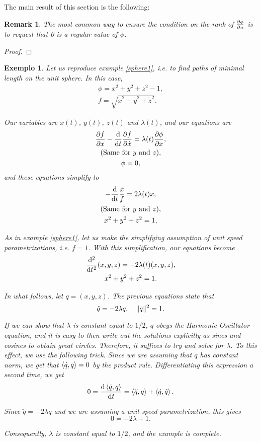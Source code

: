 \documentclass{article}
\theoremstyle{plain}
\theoremstyle{plain}
\newtheorem{remark}{Remark}
\newtheorem{example}{Exemplo}
\theoremstyle{nonumberplain}
\newtheorem{proof}{Dem}
\theoremstyle{empty}
\DeclarePairedDelimiter\norm{\lVert}{\rVert}
\begin{document}
The main result of this section is the following:


\begin{remark}
The most common way to ensure the condition on the rank of $\diffp \phi u$ is to request that 0 is a regular value of $\phi$.
\end{remark}

\begin{proof}
\end{proof}

\begin{example}
Let us reproduce example \ref{sphere1}, i.e. to find paths of minimal length on the unit sphere.  In this case,
\begin{gather*}
\phi = x^2 + y^2 + z^2 - 1,\\
f = \sqrt{\dot x^2 + \dot y^2 + \dot z^2}.
\end{gather*}

Our variables are $x(t)$, $y(t)$, $z(t)$ and $\lambda(t)$, and our equations are
\begin{gather*}
\diffp f x - \diff*{\diffp f {\dot x}}t = \lambda(t) \diffp \phi x,\\
\text{(Same for $y$ and $z$)},\\
\phi = 0,
\end{gather*}
and these equations simplify to
\begin{gather*}
- \diff*{\frac{\dot x}f}t = 2 \lambda(t) x,\\
\text{(Same for $y$ and $z$)},\\
x^2 + y^2 + z^2 = 1,
\end{gather*}

As in example \ref{sphere1}, let us make the simplifying assumption of unit speed parametrizations, i.e. $f = 1$. With this simplification, our equations become
\begin{gather*}
\diff*[2]{(x,y,z)}{t} = -2 \lambda(t) (x,y,z),\\
x^2 + y^2 + z^2 = 1.
\end{gather*}

In what follows, let $q = (x,y,z)$. The previous equations state that
\[\ddot q = - 2 \lambda q, \quad \norm{q}^2 = 1.\]

If we can show that $\lambda$ is constant equal to $1/2$, $q$ obeys the Harmonic Oscillator equation, and it is easy to then write out the solutions explicitly as sines and cosines to obtain great circles. Therefore, it suffices to try and solve for $\lambda$. To this effect, we use the following trick. Since we are assuming that $q$ has constant norm, we get that $\braket{\dot q, q} = 0$ by the product rule. Differentiating this expression a second time, we get
\[0 = \diff{\braket{\dot q, q}}t = \braket{\ddot q, q} + \braket{\dot q, \dot q}.\]

Since $\ddot q = - 2 \lambda q$ and we are assuming a unit speed parametrization, this gives
\[0 = - 2 \lambda + 1.\]

Consequently, $\lambda$ is constant equal to $1/2$, and the example is complete.
\end{example}
\end{document}
